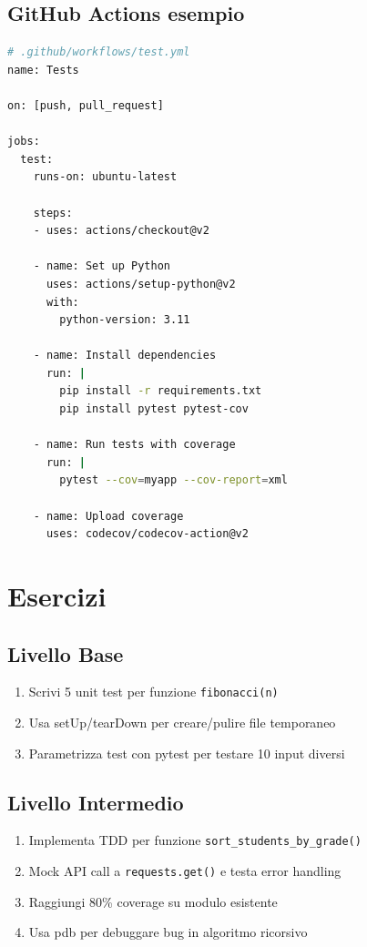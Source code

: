 \subsection{GitHub Actions esempio}

\begin{lstlisting}[language=bash]
# .github/workflows/test.yml
name: Tests

on: [push, pull_request]

jobs:
  test:
    runs-on: ubuntu-latest

    steps:
    - uses: actions/checkout@v2

    - name: Set up Python
      uses: actions/setup-python@v2
      with:
        python-version: 3.11

    - name: Install dependencies
      run: |
        pip install -r requirements.txt
        pip install pytest pytest-cov

    - name: Run tests with coverage
      run: |
        pytest --cov=myapp --cov-report=xml

    - name: Upload coverage
      uses: codecov/codecov-action@v2
\end{lstlisting}

\section{Esercizi}

\subsection{Livello Base}
\begin{enumerate}
  \item Scrivi 5 unit test per funzione \texttt{fibonacci(n)}
  \item Usa setUp/tearDown per creare/pulire file temporaneo
  \item Parametrizza test con pytest per testare 10 input diversi
\end{enumerate}

\subsection{Livello Intermedio}
\begin{enumerate}
  \item Implementa TDD per funzione \texttt{sort\_students\_by\_grade()}
  \item Mock API call a \texttt{requests.get()} e testa error handling
  \item Raggiungi 80\% coverage su modulo esistente
  \item Usa pdb per debuggare bug in algoritmo ricorsivo
\end{enumerate}

